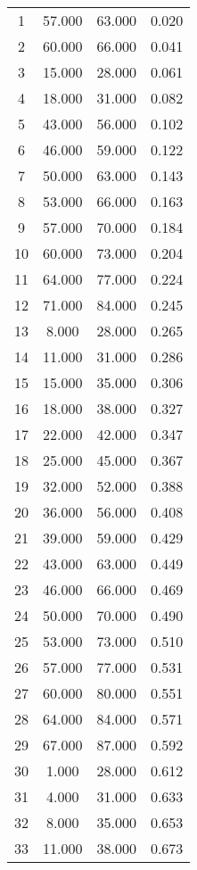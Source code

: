% 
\begin{tabular}{cccc}
  \hline
  \hline
1 & 57.000 & 63.000 & 0.020 \\ 
  2 & 60.000 & 66.000 & 0.041 \\ 
  3 & 15.000 & 28.000 & 0.061 \\ 
  4 & 18.000 & 31.000 & 0.082 \\ 
  5 & 43.000 & 56.000 & 0.102 \\ 
  6 & 46.000 & 59.000 & 0.122 \\ 
  7 & 50.000 & 63.000 & 0.143 \\ 
  8 & 53.000 & 66.000 & 0.163 \\ 
  9 & 57.000 & 70.000 & 0.184 \\ 
  10 & 60.000 & 73.000 & 0.204 \\ 
  11 & 64.000 & 77.000 & 0.224 \\ 
  12 & 71.000 & 84.000 & 0.245 \\ 
  13 & 8.000 & 28.000 & 0.265 \\ 
  14 & 11.000 & 31.000 & 0.286 \\ 
  15 & 15.000 & 35.000 & 0.306 \\ 
  16 & 18.000 & 38.000 & 0.327 \\ 
  17 & 22.000 & 42.000 & 0.347 \\ 
  18 & 25.000 & 45.000 & 0.367 \\ 
  19 & 32.000 & 52.000 & 0.388 \\ 
  20 & 36.000 & 56.000 & 0.408 \\ 
  21 & 39.000 & 59.000 & 0.429 \\ 
  22 & 43.000 & 63.000 & 0.449 \\ 
  23 & 46.000 & 66.000 & 0.469 \\ 
  24 & 50.000 & 70.000 & 0.490 \\ 
  25 & 53.000 & 73.000 & 0.510 \\ 
  26 & 57.000 & 77.000 & 0.531 \\ 
  27 & 60.000 & 80.000 & 0.551 \\ 
  28 & 64.000 & 84.000 & 0.571 \\ 
  29 & 67.000 & 87.000 & 0.592 \\ 
  30 & 1.000 & 28.000 & 0.612 \\ 
  31 & 4.000 & 31.000 & 0.633 \\ 
  32 & 8.000 & 35.000 & 0.653 \\ 
  33 & 11.000 & 38.000 & 0.673 \\ 

\end{tabular}
